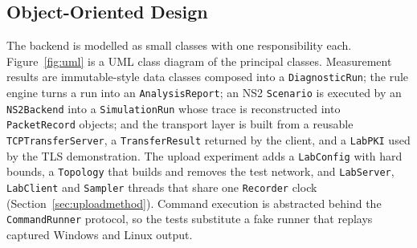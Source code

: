 \documentclass[12pt,a4paper]{report}
\numberwithin{equation}{chapter}
\begin{document}
\subsection{Object-Oriented Design}
The backend is modelled as small classes with one responsibility each. Figure~\ref{fig:uml} is a UML class diagram of the principal classes. Measurement results are immutable-style data classes composed into a \texttt{DiagnosticRun}; the rule engine turns a run into an \texttt{AnalysisReport}; an NS2 \texttt{Scenario} is executed by an \texttt{NS2Backend} into a \texttt{SimulationRun} whose trace is reconstructed into \texttt{PacketRecord} objects; and the transport layer is built from a reusable \texttt{TCPTransferServer}, a \texttt{TransferResult} returned by the client, and a \texttt{LabPKI} used by the TLS demonstration. The upload experiment adds a \texttt{LabConfig} with hard bounds, a \texttt{Topology} that builds and removes the test network, and \texttt{LabServer}, \texttt{LabClient} and \texttt{Sampler} threads that share one \texttt{Recorder} clock (Section~\ref{sec:uploadmethod}). Command execution is abstracted behind the \texttt{CommandRunner} protocol, so the tests substitute a fake runner that replays captured Windows and Linux output.
\end{document}

